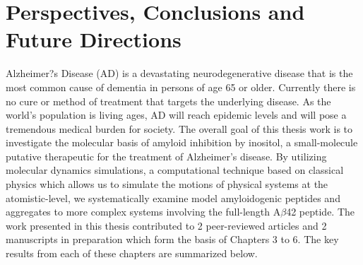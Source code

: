 \chapter{Perspectives, Conclusions and Future Directions}






Alzheimer?s Disease (AD) is a devastating neurodegenerative disease that is the most common cause of dementia in persons of age 65 or older. Currently there is no cure or method of treatment that targets the underlying disease.  As the world's population is living ages, AD will reach epidemic levels and will pose a tremendous medical burden for society. The overall goal of this thesis work is to investigate the molecular basis of amyloid inhibition by inositol, a small-molecule putative therapeutic for the treatment of Alzheimer's disease. By utilizing molecular dynamics simulations, a computational technique based on classical physics which allows us to simulate the motions of physical systems at the atomistic-level, we systematically examine model amyloidogenic peptides and aggregates to more complex systems involving the full-length A$\beta$42 peptide. The work presented in this thesis contributed to 2 peer-reviewed articles and 2 manuscripts in preparation which form the basis of Chapters 3 to 6.  The key results from each of these chapters are summarized below.


